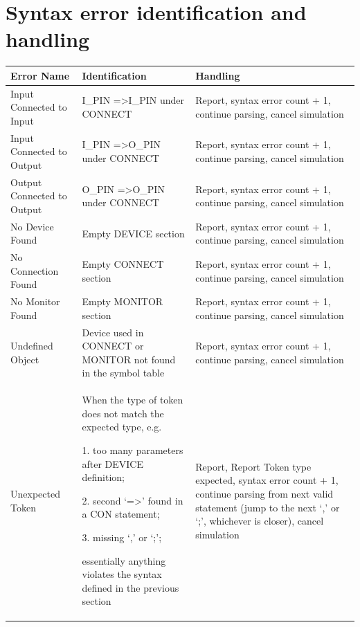 \documentclass[12pt]{article}
\begin{document}
\section{Syntax error identification and handling}
\begin{center}
	\begin{tabular}{|m{3cm} | m{6cm} | m{8cm} |}
		\hline
		Error Name & Identification & Handling \\
		\hline
		Input Connected to Input & I\_PIN =\textgreater  I\_PIN under CONNECT &  Report, syntax error count + 1, continue parsing, cancel simulation \\
		\hline
		Input Connected to Output & I\_PIN =\textgreater  O\_PIN under CONNECT &  Report, syntax error count + 1, continue parsing, cancel simulation \\
		\hline
		Output Connected to Output & O\_PIN =\textgreater  O\_PIN under CONNECT &  Report, syntax error count + 1, continue parsing, cancel simulation \\
		\hline
		No Device Found & Empty DEVICE section & Report, syntax error count + 1, continue parsing, cancel simulation \\
		\hline
		No Connection Found & Empty CONNECT section & Report, syntax error count + 1, continue parsing, cancel simulation \\
		\hline
		No Monitor Found & Empty MONITOR section & Report, syntax error count + 1, continue parsing, cancel simulation \\
		\hline
		Undefined Object & Device used in CONNECT or MONITOR not found in the symbol table & Report, syntax error count + 1, continue parsing, cancel simulation \\
		\hline
		Unexpected Token & When the type of token does not match the expected type, e.g. 
		
		1. too many parameters after DEVICE definition; 
		
		2. second `=\textgreater' found in a CON statement; 
		
		3. missing `,' or `;';  
		
		essentially anything violates the syntax defined in the previous section
		& Report, Report Token type expected,  syntax error count + 1, continue parsing from next valid statement (jump to the next `,' or `;', whichever is closer), cancel simulation \\
		\hline
	
	\end{tabular}
\end{center}
\newpage
\end{document}

